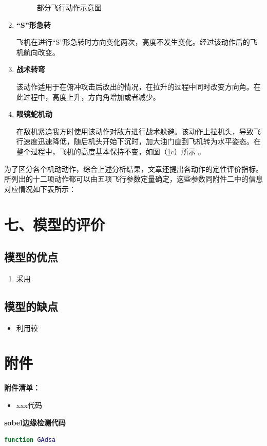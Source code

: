 \documentclass{my_paper}
\begin{document}
\begin{enumerate}
\begin{figure}[htbp]
        \caption{部分飞行动作示意图}    %
        \label{dz}    %
    \end{figure}
    
    \item \textbf{“S”形急转}
    
    飞机在进行“S”形急转时方向变化两次，高度不发生变化。经过该动作后的飞机航向改变。

    \item \textbf{战术转弯}
    
    该动作适用于在俯冲攻击后改出的情况，在拉升的过程中同时改变方向角。在此过程中，高度上升，方向角增加或者减少。

    \item \textbf{眼镜蛇机动}
    
    在敌机紧追我方时使用该动作对敌方进行战术躲避。\cite{7}该动作上拉机头，导致飞行速度迅速降低，随后机头开始下沉时，加大油门直到飞机转为水平姿态。在整个过程中，飞机的高度基本保持不变，如图（\ref{dz}c）所示 。
    
\end{enumerate}

为了区分各个机动动作，综合上述分析结果，文章还提出各动作的定性评价指标。所列出的十二项动作都可以由五项飞行参数定量确定，这些参数同附件二中的信息对应情况如下表所示：
\section{七、模型的评价}

\subsection{模型的优点}
\begin{enumerate}
    \item 采用

\end{enumerate}

\subsection{模型的缺点}
\begin{itemize}
    \item 利用较

\end{itemize}

\newpage
\begin{center}
\end{center}

\newpage
\section{附件}
\textbf{附件清单：}
\begin{itemize}
    \item xxx代码
\end{itemize}

\textbf{sobel边缘检测代码}

\begin{lstlisting}[language=matlab]
    function GAdsa 
\end{lstlisting}
\end{document}

